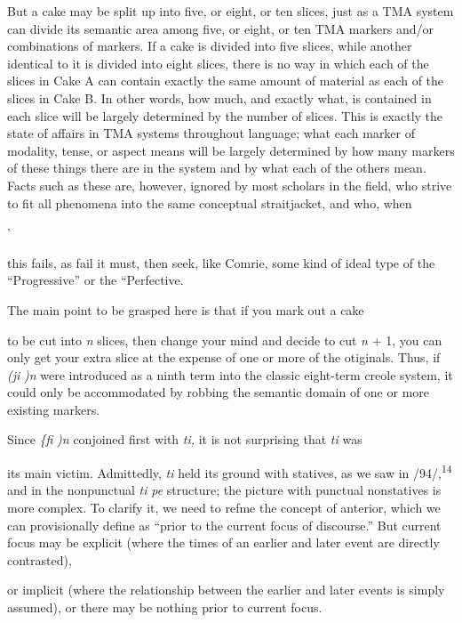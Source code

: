 But a cake may be split up into five, or eight, or ten slices, just as a TMA system can divide its semantic area among five, or eight, or ten TMA markers and/or combinations of markers. If a cake is divided into five slices, while another identical to it is divided into eight slices, there is no way in which each of the slices in Cake A can contain exactly the same amount of material as each of the slices in Cake B. In other words, how much, and exactly what, is contained in each slice will be largely determined by the number of slices. This is exactly the state of affairs in TMA systems throughout language; what each marker of modality, tense, or aspect means will be largely determined by how many markers of these things there are in the system and by what each of the others mean. Facts such as these are, however, ignored by most scholars in the field, who strive to fit all phenomena into the same conceptual straitjacket, and who, when

'


this fails, as fail it must, then seek, like Comrie, some kind of ideal type of the ``Progressive'' or the ``Perfective.{\textquotedbl}

The main point to be grasped here is that if you mark out a cake

to be cut into \textit{n} slices, then change your mind and decide to cut \textit{n} + 1, you can only get your extra slice at the expense of one or more of the otiginals. Thus, if \textit{(ji} \textit{)n} were introduced as a ninth term into the classic eight-term creole system, it could only be accommodated by robbing the semantic domain of one or more existing markers.

Since \textit{\{}\textit{fi} \textit{)n }conjoined first with \textit{ti,} it is not surprising that \textit{ti} was

its main victim. Admittedly, \textit{ti} held its ground with statives, as we saw in /94/,\textsuperscript{1}\textsuperscript{4} and in the nonpunctual \textit{ti} \textit{pe} structure; the picture with punctual nonstatives is more complex. To clarify it, we need to refme the concept of anterior, which we can provisionally define as ``prior to the current focus of discourse.'' But current focus may be explicit (where the times of an earlier and later event are directly contrasted),

or implicit (where the relationship between the earlier and later events is simply assumed), or there may be nothing prior to current focus.

